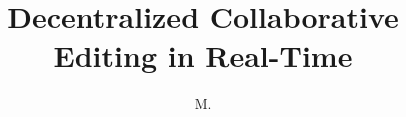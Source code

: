 \documentclass[francais, 12pt, fancyChapter, oneside]{these-LUNAM}
\title{Decentralized Collaborative Editing in Real-Time}
\author{M.}{Brice}{Nédelec}
\date{}
\begin{document}
\maketitle

\dominitoc
\tableofcontents



% 
% 
% 
% 




\end{document}
